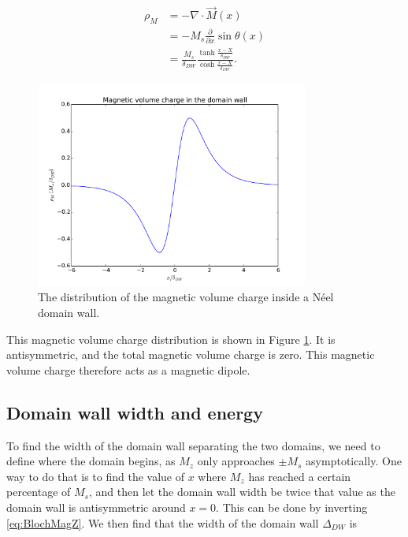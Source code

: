 \documentclass[1p]{elsarticle}		%
\numberwithin{equation}{section}
\begin{document}
\begin{align*}
\rho_M &= -\nabla\cdot\vec{M}(x) \\
&= -M_s \frac{\partial}{\partial x} \sin \theta(x) \\
&= \frac{M_s}{\delta_{DW}}\frac{\tanh\frac{x-X}{\delta_{DW}}}{\cosh\frac{x-X}{\delta_{DW}}}.
\end{align*}

\begin{figure}[h!]
\begin{center}
\includegraphics[width=0.8\textwidth]{Figures/MagneticVolumeCharge.pdf} 
\caption{The distribution of the magnetic volume charge inside a N\'{e}el domain wall.}
\label{fig:magVolumeCharge} 
\end{center}
\end{figure}

This magnetic volume charge distribution is shown in Figure \ref{fig:magVolumeCharge}. It is antisymmetric, and the total magnetic volume charge is zero. This magnetic volume charge therefore acts as a magnetic dipole.

\subsection{Domain wall width and energy}
To find the width of the domain wall separating the two domains, we need to define where the domain begins, as $M_z$ only approaches $\pm M_s$ asymptotically. One way to do that is to find the value of $x$ where $M_z$ has reached a certain percentage of $M_s$, and then let the domain wall width be twice that value as the domain wall is antisymmetric around $x=0$. This can be done by inverting \eqref{eq:BlochMagZ}. We then find that the width of the domain wall $\Delta_{DW}$ is
\end{document}
